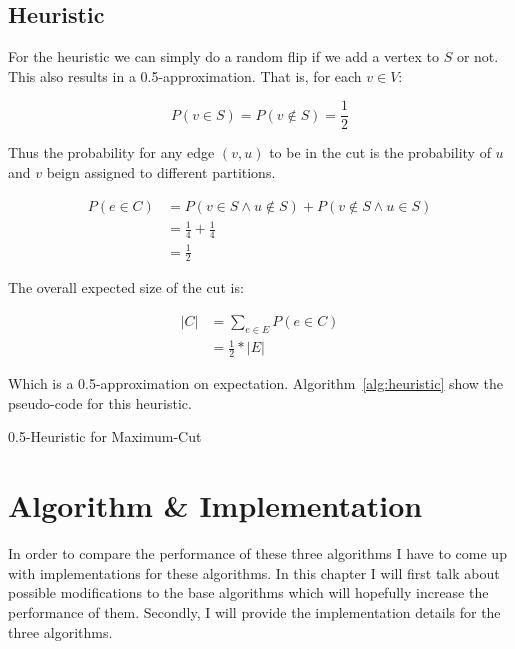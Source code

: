 \documentclass[twocolumn]{article}
\begin{document}
 
\subsection{Heuristic}

For the heuristic we can simply do a random flip if we add a vertex to $S$ or not.
This also results in a 0.5-approximation. That is, for each $v \in V$:

\[
  P(v \in S) = P(v \notin S) = \frac{1}{2}
\]

Thus the probability for any edge $(v, u)$ to be in the cut is the probability of $u$ and $v$
beign assigned to different partitions.

\begin{align*}
  P(e \in C) & = P(v \in S \wedge u \notin S) + P(v \notin S \wedge u \in S) \\
  & = \frac{1}{4} + \frac{1}{4} \\
  & = \frac{1}{2}
\end{align*}

The overall expected size of the cut is:

\begin{align*}
  |C| & = \sum_{e \in E} P(e \in C) \\
  & = \frac{1}{2} * |E|
\end{align*}

Which is a 0.5-approximation on expectation.
Algorithm~\ref{alg:heuristic} show the pseudo-code for this heuristic.

\begin{algorithm}
  \caption{0.5-Heuristic for Maximum-Cut}
  \label{alg:heuristic}
\end{algorithm}


\section{Algorithm \& Implementation}
In order to compare the performance of these three algorithms I have to come up with implementations for these algorithms.
In this chapter I will first talk about possible modifications to the base algorithms which will hopefully increase the performance of them.
Secondly, I will provide the implementation details for the three algorithms.
\end{document}
